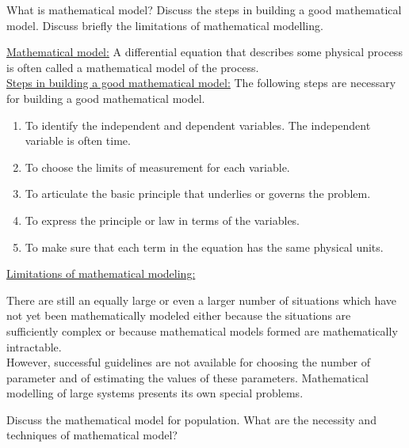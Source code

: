 \documentclass[../main-sheet.tex]{subfiles}
\begin{document}
\begin{prob}
    What is mathematical model? Discuss the steps in building a good mathematical model. Discuss briefly the limitations of mathematical modelling.
\end{prob}
\begin{soln}
    \underline{Mathematical model:} A differential equation that describes some physical process is often called a mathematical model of the process.\\
    \underline{Steps in building a good mathematical model:} The following steps are necessary for building a good mathematical model.
    \begin{enumerate}[label=(\roman*)]
        \item To identify the independent and dependent variables. The independent variable is often time.
        \item To choose the limits of measurement for each variable.
        \item To articulate the basic principle that underlies or governs the problem.
        \item To express the principle or law in terms of the variables.
        \item To make sure that each term in the equation has the same physical units.
    \end{enumerate}
    \underline{Limitations of mathematical modeling:}

    There are still an equally large or even a larger number of situations which have not yet been mathematically modeled either because the situations are sufficiently complex or because mathematical models formed are mathematically intractable.\\
    However, successful guidelines are not available for choosing the number of parameter and of estimating the values of these parameters. Mathematical modelling of large systems presents its own special problems.
\end{soln}
\begin{prob}
    Discuss the mathematical model for population. What are the necessity and techniques of mathematical model?
\end{prob}
\end{document}
